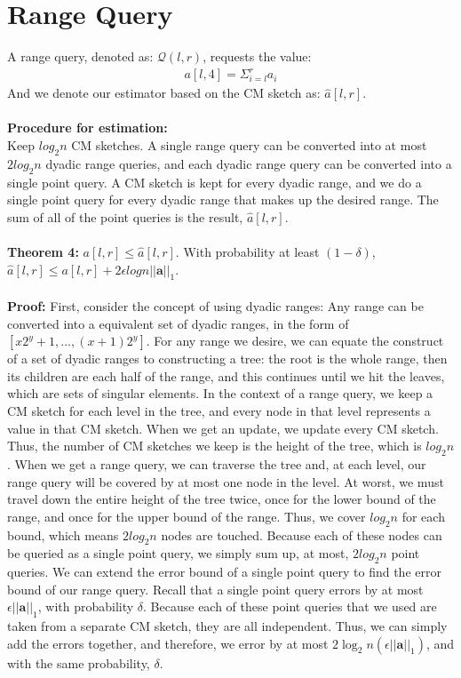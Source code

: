 \documentclass[11pt]{article}
\begin{document}
\section{Range Query}
A range query, denoted as: $\mathcal{Q}(l,r)$, requests the value:
\begin{align*}
    a[l,4] = \Sigma_{i=l}^r a_i
\end{align*}
And we denote our estimator based on the CM sketch as: $\hat a[l,r]$.\\\\
    \textbf{Procedure for estimation:}\\
    Keep $log_2n$ CM sketches. A single range query can be converted into at most $2log_2n$ dyadic range queries, and each dyadic range query can be converted into a single point query. A CM sketch is kept for every dyadic range, and we do a single point query for every dyadic range that makes up the desired range. The sum of all of the point queries is the result, $\hat a[l,r]$.\\\\
    \textbf{Theorem 4: } $a[l,r] \leq \hat a[l,r]$. With probability at least $(1-\delta)$, $\hat a[l,r] \leq a[l,r] + 2\epsilon logn ||\bm{a}||_1$.\\\\
    
    \textbf{Proof: } First, consider the concept of using dyadic ranges: Any range can be converted into a equivalent set of dyadic ranges, in the form of $[x2^y+1, ... , (x+1)2^y]$. For any range we desire, we can equate the construct of a set of dyadic ranges to constructing a tree: the root is the whole range, then its children are each half of the range, and this continues until we hit the leaves, which are sets of singular elements. In the context of a range query, we keep a CM sketch for each level in the tree, and every node in that level represents a value in that CM sketch. When we get an update, we update every CM sketch. Thus, the number of CM sketches we keep is the height of the tree, which is $log_2n$. When we get a range query, we can traverse the tree and, at each level, our range query will be covered by at most one node in the level. At worst, we must travel down the entire height of the tree twice, once for the lower bound of the range, and once for the upper bound of the range. Thus, we cover $log_2n$ for each bound, which means $2log_2n$ nodes are touched. Because each of these nodes can be queried as a single point query, we simply sum up, at most, $2log_2n$ point queries. We can extend the error bound of a single point query to find the error bound of our range query. Recall that a single point query errors by at most $\epsilon ||\bm{a}||_1$, with probability $\delta$. Because each of these point queries that we used are taken from a separate CM sketch, they are all independent. Thus, we can simply add the errors together, and therefore, we error by at most $2\log_2n(\epsilon||\bm{a}||_1)$, and with the same probability, $\delta$.
\end{document}
